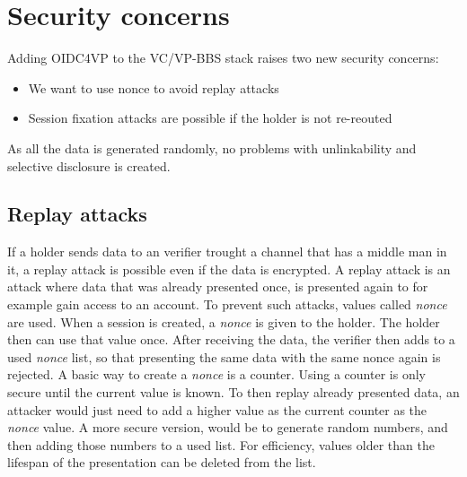 \documentclass[
	a4paper               %
	,BCOR=0mm            %
	,bibliography=totoc   %
	,listof=totoc         %
	,monolingual
	,twoside=false
]{bfhthesis}              %
\begin{document}
\section{Security concerns}
Adding OIDC4VP to the VC/VP-BBS stack raises two new security concerns:
\begin{itemize}
	\item We want to use nonce to avoid replay attacks
	\item Session fixation attacks are possible if the holder is not re-reouted
\end{itemize}
As all the data is generated randomly, no problems with unlinkability and selective disclosure is created.

\subsection{Replay attacks}
If a holder sends data to an verifier trought a channel that has a middle man in it, a replay attack is possible even if the data is encrypted.
A replay attack is an attack where data that was already presented once, is presented again to for example gain access to an account.
To prevent such attacks, values called \textit{nonce} are used. When a session is created, a \textit{nonce} is given to the holder.
The holder then can use that value once. After receiving the data, the verifier then adds to a used \textit{nonce} list, so that presenting the same data with the same nonce again is rejected.
A basic way to create a \textit{nonce} is a counter. Using a counter is only secure until the current value is known. To then replay already presented data, an attacker would just need to add a higher value as the current counter as the \textit{nonce} value.
A more secure version, would be to generate random numbers, and then adding those numbers to a used list.
For efficiency, values older than the lifespan of the presentation can be deleted from the list.
\end{document}
